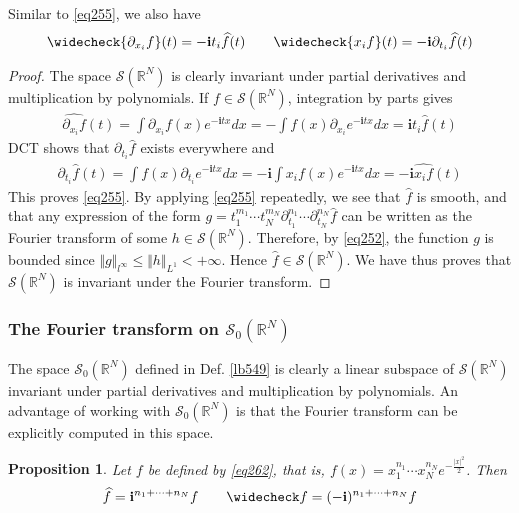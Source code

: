 \documentclass[12pt,b5paper,notitlepage]{article}
\theoremstyle{definition}
\theoremstyle{plain}
\newtheorem{pp}[df]{Proposition}
\newcommand{\wht}{\widehat}
\newcommand{\wch}{\widecheck}
\newcommand{\im}{\mathbf{i}}
\newcommand{\Rbb}{\mathbb R}
\newcommand{\MS}{\mathcal S}
\numberwithin{equation}{section}
\begin{document}
Similar to \eqref{eq255}, we also have
\begin{align*}
\wch{\partial_{x_i}f}(t)=-\im t_i \wht f(t)\qquad \wch{x_if}(t)=-\im\partial_{t_i}\wht f(t)
\end{align*}


\begin{proof}
The space $\MS(\Rbb^N)$ is clearly invariant under partial derivatives and multiplication by polynomials. If $f\in\MS(\Rbb^N)$, integration by parts gives
\begin{align*}
\wht{\partial_{x_i}f}(t)=\int \partial_{x_i}f(x)e^{-\im tx}dx=-\int f(x)\partial_{x_i}e^{-\im tx}dx=\im t_i \wht f(t)
\end{align*} 
DCT shows that $\partial_{t_i}\wht f$ exists everywhere and
\begin{align*}
\partial_{t_i}\wht f(t)=\int f(x)\partial_{t_i}e^{-\im tx}dx=-\im\int x_if(x)e^{-\im tx}dx=-\im\wht{x_if}(t)
\end{align*}
This proves \eqref{eq255}. By applying \eqref{eq255} repeatedly, we see that $\wht f$ is smooth, and that any expression of the form $g=t_1^{m_1}\cdots t_N^{m_N}\partial_{t_1}^{n_1}\cdots \partial_{t_N}^{n_N}\wht f$ can be written as the Fourier transform of some $h\in \MS(\Rbb^N)$. Therefore, by \eqref{eq252}, the function $g$ is bounded since $\Vert g\Vert_{l^\infty}\leq\Vert h\Vert_{L^1}<+\infty$. Hence $\wht f\in\MS(\Rbb^N)$. We have thus proves that $\MS(\Rbb^N)$ is invariant under the Fourier transform.
\end{proof}



\subsubsection{The Fourier transform on $\MS_0(\Rbb^N)$}



The space $\MS_0(\Rbb^N)$ defined in Def. \ref{lb549} is clearly a linear subspace of $\MS(\Rbb^N)$ invariant under partial derivatives and multiplication by polynomials. An advantage of working with $\MS_0(\Rbb^N)$ is that the Fourier transform can be explicitly computed in this space.


\begin{pp}\label{lb511}
Let $f$ be defined by \eqref{eq262}, that is, $f(x)=x_1^{n_1}\cdots x_N^{n_N}e^{-\frac{|x|^2}2}$. Then
\begin{gather*}
\wht f=\im^{n_1+\cdots+n_N} f\qquad \wch f=(-\im)^{n_1+\cdots+n_N}f
\end{gather*}
\end{pp}
\end{document}
